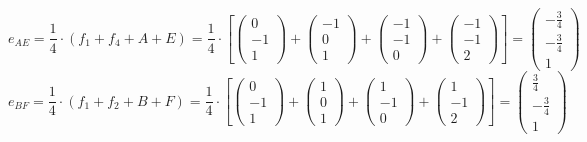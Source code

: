 \documentclass{article}
\begin{document}
\[e_{AE}=\frac{1}{4}\cdot(f_1+f_4+A+E)=\frac{1}{4}\cdot\left[
\left({\begin{array}{c} 0 \\  -1 \\ 1 \end{array}}\right)+
\left({\begin{array}{c} -1 \\ 0 \\ 1 \end{array}}\right)+
\left({\begin{array}{c} -1 \\ -1 \\ 0 \end{array}}\right)+
\left({\begin{array}{c} -1 \\  -1 \\ 2 \end{array}}\right)\right]=
\left({\begin{array}{c}  -\frac{3}{4} \\ -\frac{3}{4} \\ 1 \end{array}}\right)
\]
\[e_{BF}=\frac{1}{4}\cdot(f_1+f_2+B+F)=\frac{1}{4}\cdot\left[
\left({\begin{array}{c} 0 \\  -1 \\ 1 \end{array}}\right)+
\left({\begin{array}{c} 1 \\ 0 \\ 1 \end{array}}\right)+
\left({\begin{array}{c} 1 \\ -1 \\ 0 \end{array}}\right)+
\left({\begin{array}{c} 1 \\  -1 \\ 2 \end{array}}\right)\right]=
\left({\begin{array}{c}  \frac{3}{4} \\ -\frac{3}{4} \\ 1 \end{array}}\right)
\]
\end{document}
